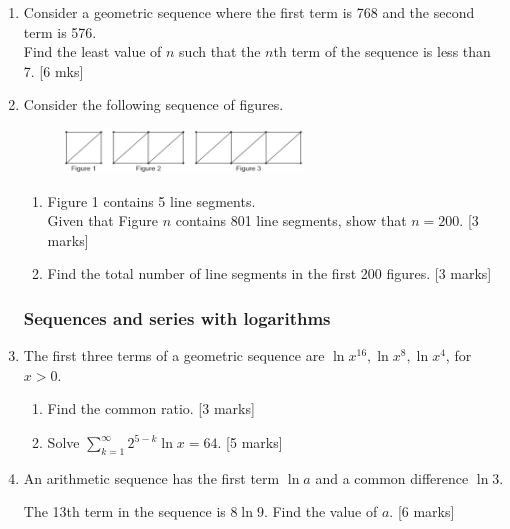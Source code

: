 \documentclass[12pt, twoside]{article}
\begin{document}
\begin{enumerate}[itemsep=0.5cm]
\item Consider a geometric sequence where the first term is 768 and the second term is 576.\\
Find the least value of $n$ such that the $n$th term of the sequence is less than 7. \hfill [6 mks]

\item Consider the following sequence of figures.
    \begin{figure}[H]
        \centering
        \includegraphics[width=0.6\textwidth]{../graphics/sequence-boxes.png}
    \end{figure}
    \begin{enumerate}
        \item Figure 1 contains 5 line segments.\\
        Given that Figure $n$ contains 801 line segments, show that $n=200$. \hfill [3 marks]
        \item Find the total number of line segments in the first 200 figures. \hfill [3 marks]
    \end{enumerate}

\newpage
\subsubsection*{Sequences and series with logarithms}

\item The first three terms of a geometric sequence are $\ln x^{16}, \ln x^{8},\ln x^{4}$, for $x>0$.
    \begin{enumerate}
        \item Find the common ratio. \hfill [3 marks]
        \item Solve $\displaystyle \sum_{k=1}^{\infty} 2^{5-k} \ln x = 64$. \hfill [5 marks]
    \end{enumerate}

\item An arithmetic sequence has the first term $\ln a$ and a common difference $\ln 3$.\par
The 13th term in the sequence is $8 \ln 9$. Find the value of $a$. \hfill [6 marks]


\end{enumerate}
\end{document}
